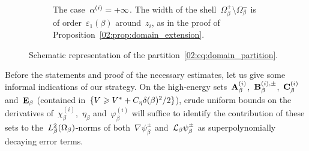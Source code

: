 \begin{figure}
\begin{subfigure}{\linewidth}
                    \caption[]{The case~$\alpha^{(i)}=+\infty$. The width of the shell~$\Omega_\beta^+\setminus\Omega_\beta^-$ is of order~$\varepsilon_1(\beta)$ around~$z_i$, as in the proof of Proposition~\ref{02:prop:domain_extension}.}
                \end{subfigure}
        \caption[Partition of the domain in~\cite{BLS25a}]{\label{02:fig:partition}Schematic representation of the partition~\eqref{02:eq:domain_partition}.}
        \end{figure}
        Before the statements and proof of the necessary estimates, let us give some informal indications of our strategy.
        On the high-energy sets~$\mathbf{A}_\beta^{(i)}$,~$\mathbf{B}_\beta^{(i),\pm}$,~$\mathbf{C}_\beta^{(i)}$ and~$\mathbf{E}_\beta$ (contained in~$\{V\geqslant V^*+C_\eta\delta(\beta)^2/2\}$), crude uniform bounds on the derivatives of~$\chi_\beta^{(i)}$,~$\eta_\beta$ and~$\varphi_\beta^{(i)}$ will suffice to identify the contribution of these sets to the~$L_\beta^2(\Omega_\beta)$-norms of both~$\nabla \psi_\beta^\pm$ and~$\mathcal{L}_\beta\psi_\beta^\pm$ as superpolynomially decaying error terms.
